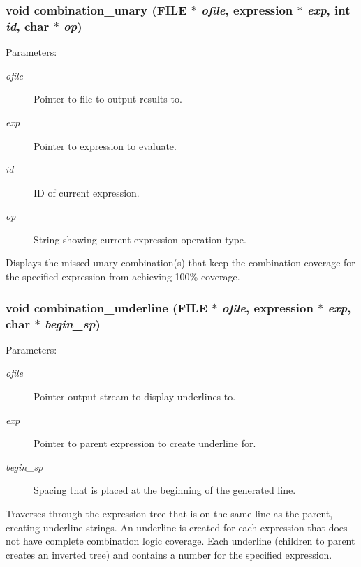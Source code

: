 \subsubsection{\setlength{\rightskip}{0pt plus 5cm}void combination\_\-unary (FILE $\ast$ {\em ofile}, {\bf expression} $\ast$ {\em exp}, int {\em id}, char $\ast$ {\em op})}\label{comb_8c_a13}


\begin{Desc}
\item[Parameters: ]\par
\begin{description}
\item[{\em 
ofile}]Pointer to file to output results to. \item[{\em 
exp}]Pointer to expression to evaluate. \item[{\em 
id}]ID of current expression. \item[{\em 
op}]String showing current expression operation type.\end{description}
\end{Desc}
Displays the missed unary combination(s) that keep the combination coverage for the specified expression from achieving 100\% coverage. 
\subsubsection{\setlength{\rightskip}{0pt plus 5cm}void combination\_\-underline (FILE $\ast$ {\em ofile}, {\bf expression} $\ast$ {\em exp}, char $\ast$ {\em begin\_\-sp})}\label{comb_8c_a12}


\begin{Desc}
\item[Parameters: ]\par
\begin{description}
\item[{\em 
ofile}]Pointer output stream to display underlines to. \item[{\em 
exp}]Pointer to parent expression to create underline for. \item[{\em 
begin\_\-sp}]Spacing that is placed at the beginning of the generated line.\end{description}
\end{Desc}
Traverses through the expression tree that is on the same line as the parent, creating underline strings. An underline is created for each expression that does not have complete combination logic coverage. Each underline (children to parent creates an inverted tree) and contains a number for the specified expression. 
